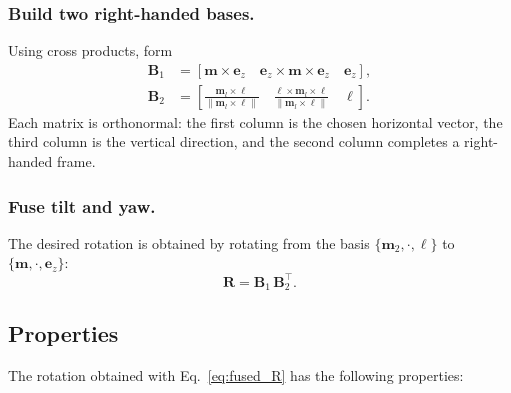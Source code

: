 \documentclass[10pt,twocolumn]{ICCAS}
\begin{document}
\subsubsection{ Build two right-handed bases.}
Using cross products, form
\begin{align}
  \boldsymbol{B}_{1}
  &=
  \left[
    \boldsymbol{m}\times\boldsymbol{e}_{z}\quad
    \boldsymbol{e}_{z}\times\boldsymbol{m}\times\boldsymbol{e}_{z}\quad
    \boldsymbol{e}_{z}
  \right],\\
  \boldsymbol{B}_{2}
  &=
  \left[
    \frac{\boldsymbol{m}_{l}\times\boldsymbol{\ell}}
         {\|\boldsymbol{m}_{l}\times\boldsymbol{\ell}\|}\quad
    \frac{\boldsymbol{\ell}\times\boldsymbol{m}_{l}\times\boldsymbol{\ell}}
         {\|\boldsymbol{m}_{l}\times\boldsymbol{\ell}\|}\quad
    \boldsymbol{\ell}
  \right].
\end{align}
Each matrix is orthonormal: the first column is the chosen horizontal
vector, the third column is the vertical direction, and the second
column completes a right-handed frame.

\subsubsection{ Fuse tilt and yaw.}
The desired rotation is obtained by rotating from the basis
$\{\boldsymbol{m}_{2},\cdot,\boldsymbol{\ell}\}$ to
$\{\boldsymbol{m},\cdot,\boldsymbol{e}_{z}\}$:
\begin{equation}
  \boldsymbol{R} = \boldsymbol{B}_{1}\,\boldsymbol{B}_{2}^{\top}.
  \label{eq:fused_R}
\end{equation}



\subsection{Properties}

The rotation obtained with Eq.~\eqref{eq:fused_R} has the following
properties:
\end{document}
